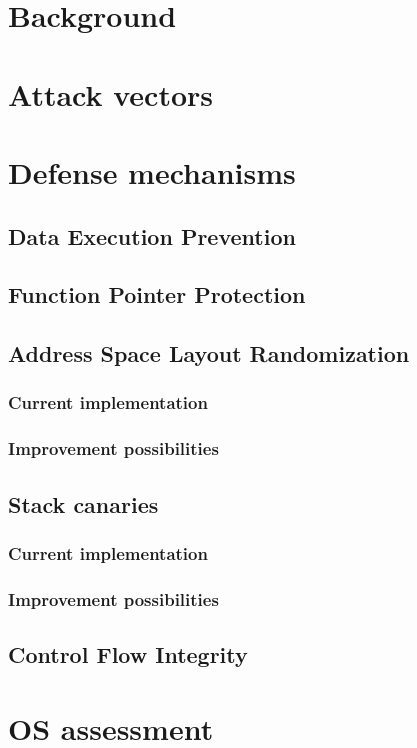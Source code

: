 \chapter{Background}
\label{chp:background}

\chapter{Attack vectors}
\label{chp:attack-vectors}

\chapter{Defense mechanisms}
\label{chp:defense-mechanisms}

\section{Data Execution Prevention}
\label{sec:dep}

\section{Function Pointer Protection}
\label{sec:fpp}

\section{Address Space Layout Randomization}
\label{sec:aslr}

\subsection{Current implementation}
\label{subsec:aslr-current}

\subsection{Improvement possibilities}
\label{subsec:aslr-improvement}

\section{Stack canaries}
\label{sec:stack-canaries}

\subsection{Current implementation}
\label{subsec:canaries-current}

\subsection{Improvement possibilities}
\label{śubsec:canaries-improvement}

\section{Control Flow Integrity}
\label{sec:cfi}

\chapter{OS assessment}
\label{chp:os-assessment}